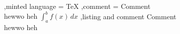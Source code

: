 \documentclass[11pt]{book}
\begin{document}
\begin{tcblisting}{
    ,minted language = TeX
    ,comment = {Comment\\ hewwo \hspace{10cm} heh \(\int_{a}^{b}f(x)\,dx\)}
    ,listing and comment
}
Comment\\ hewwo \hspace{10cm} heh
\end{tcblisting}
\end{document}
